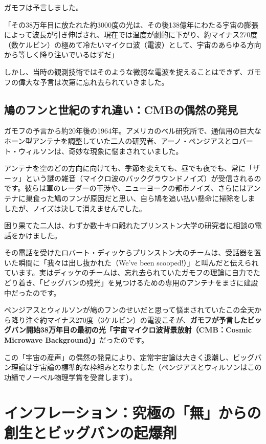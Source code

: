 ガモフは予言しました。

「その38万年目に放たれた約3000度の光は、その後138億年にわたる宇宙の膨張によって波長が引き伸ばされ、現在では温度が劇的に下がり、約マイナス270度（数ケルビン）の極めて冷たいマイクロ波（電波）として、宇宙のあらゆる方向から等しく降り注いでいるはずだ」

しかし、当時の観測技術ではそのような微弱な電波を捉えることはできず、ガモフの偉大な予言は次第に忘れ去られていきました。

\subsection{鳩のフンと世紀のすれ違い：CMBの偶然の発見}

ガモフの予言から約20年後の1964年。アメリカのベル研究所で、通信用の巨大なホーン型アンテナを調整していた二人の研究者、アーノ・ペンジアスとロバート・ウィルソンは、奇妙な現象に悩まされていました。

アンテナを空のどの方向に向けても、季節を変えても、昼でも夜でも、常に「ザーッ」という謎の雑音（マイクロ波のバックグラウンドノイズ）が受信されるのです。彼らは軍のレーダーの干渉や、ニューヨークの都市ノイズ、さらにはアンテナに巣食った鳩のフンが原因だと思い、自ら鳩を追い払い懸命に掃除をしましたが、ノイズは決して消えませんでした。

困り果てた二人は、わずか数十キロ離れたプリンストン大学の研究者に相談の電話をかけました。

その電話を受けたロバート・ディッケらプリンストン大のチームは、受話器を置いた瞬間に「我々は出し抜かれた（We've been scooped!）」と叫んだと伝えられています。実はディッケのチームは、忘れ去られていたガモフの理論に自力でたどり着き、「ビッグバンの残光」を見つけるための専用のアンテナをまさに建設中だったのです。

ペンジアスとウィルソンが鳩のフンのせいだと思って悩まされていたこの全天から降り注ぐ約マイナス270度（3ケルビン）の電波こそが、\textbf{ガモフが予言したビッグバン開始38万年目の最初の光「宇宙マイクロ波背景放射（CMB：Cosmic Microwave Background）」}だったのです。

この「宇宙の産声」の偶然の発見により、定常宇宙論は大きく退潮し、ビッグバン理論は宇宙論の標準的な枠組みとなりました（ペンジアスとウィルソンはこの功績でノーベル物理学賞を受賞します）。

\section{インフレーション：究極の「無」からの創生とビッグバンの起爆剤}

